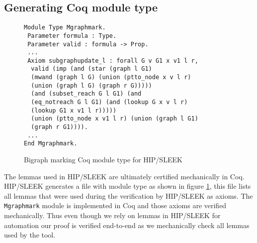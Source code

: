 \subsection{Generating Coq module type}

\begin{figure}[t]
  \begin{lstlisting}
Module Type Mgraphmark.
 Parameter formula : Type.
 Parameter valid : formula -> Prop.
 ...
 Axiom subgraphupdate_l : forall G v G1 x v1 l r,
  valid (imp (and (star (graph l G1)
  (mwand (graph l G) (union (ptto_node x v l r)
  (union (graph l G) (graph r G)))))
  (and (subset_reach G l G1) (and
  (eq_notreach G l G1) (and (lookup G x v l r)
  (lookup G1 x v1 l r)))))
  (union (ptto_node x v1 l r) (union (graph l G1)
  (graph r G1)))).
 ...
End Mgraphmark.
\end{lstlisting}
\caption{Bigraph marking Coq module type for HIP/SLEEK}
\label{fig:hipcoqfile}
\end{figure}

The lemmas used in HIP/SLEEK are ultimately certified mechanically in Coq. HIP/SLEEK generates a file with module type as shown in figure \ref{fig:hipcoqfile}, this file lists all lemmas that were used during the verification by HIP/SLEEK as axioms. The \texttt{Mgraphmark} module is implemented in Coq and those axioms are verified mechanically. Thus even though we rely on lemmas in HIP/SLEEK for automation our proof is verified end-to-end as we mechanically check all lemmas used by the tool. 